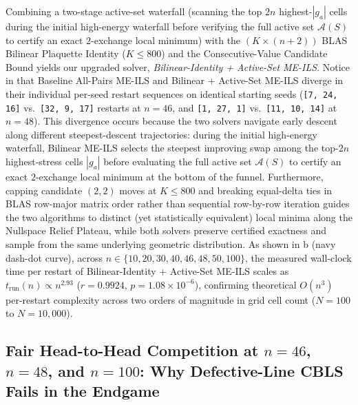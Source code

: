 Combining a two-stage active-set waterfall (scanning the top $2n$ highest-$|g_a|$ cells during the initial high-energy waterfall before verifying the full active set $\mathcal{A}(S)$ to certify an exact $2$-exchange local minimum) with the $(K \times (n+2))$ BLAS Bilinear Plaquette Identity ($K \le 800$) and the Consecutive-Value Candidate Bound yields our upgraded solver, \emph{Bilinear-Identity + Active-Set ME-ILS}. Notice in  that Baseline All-Pairs ME-ILS and Bilinear + Active-Set ME-ILS diverge in their individual per-seed restart sequences on identical starting seeds (\texttt{[7, 24, 16]} vs.\ \texttt{[32, 9, 17]} restarts at $n=46$, and \texttt{[1, 27, 1]} vs.\ \texttt{[11, 10, 14]} at $n=48$). This divergence occurs because the two solvers navigate early descent along different steepest-descent trajectories: during the initial high-energy waterfall, Bilinear ME-ILS selects the steepest improving swap among the top-$2n$ highest-stress cells $|g_a|$ before evaluating the full active set $\mathcal{A}(S)$ to certify an exact $2$-exchange local minimum at the bottom of the funnel. Furthermore, capping candidate $(2,2)$ moves at $K \le 800$ and breaking equal-delta ties in BLAS row-major matrix order rather than sequential row-by-row iteration guides the two algorithms to distinct (yet statistically equivalent) local minima along the Nullspace Relief Plateau, while both solvers preserve certified exactness and sample from the same underlying geometric distribution. As shown in b (navy dash-dot curve), across $n \in \{10, 20, 30, 40, 46, 48, 50, 100\}$, the measured wall-clock time per restart of Bilinear-Identity + Active-Set ME-ILS scales as $t_{\mathrm{run}}(n) \propto n^{2.93}$ ($r = 0.9924$, $p = 1.08\times 10^{-6}$), confirming theoretical $O(n^3)$ per-restart complexity across two orders of magnitude in grid cell count ($N = 100$ to $N = 10{,}000$).

\subsection{Fair Head-to-Head Competition at \texorpdfstring{$n = 46$}{n = 46}, \texorpdfstring{$n = 48$}{n = 48}, and \texorpdfstring{$n = 100$}{n = 100}: Why Defective-Line CBLS Fails in the Endgame}

